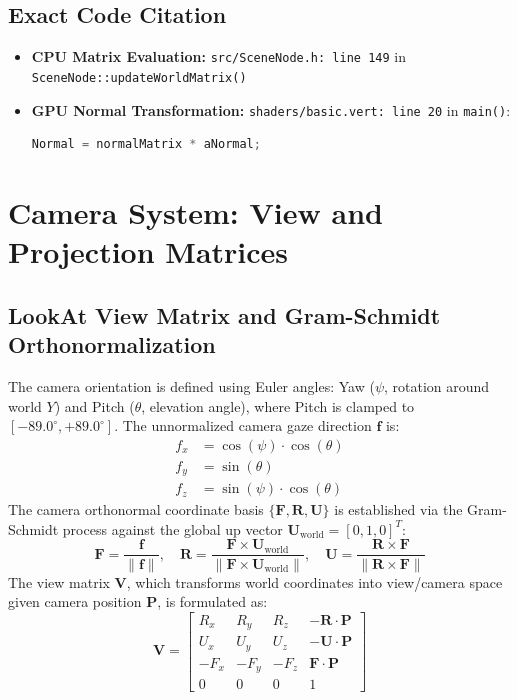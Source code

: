 \subsection{Exact Code Citation}
\begin{itemize}
    \item \textbf{CPU Matrix Evaluation:} \texttt{src/SceneNode.h: line 149} in \texttt{SceneNode::updateWorldMatrix()}
    \item \textbf{GPU Normal Transformation:} \texttt{shaders/basic.vert: line 20} in \texttt{main()}:
    \begin{lstlisting}[language=GLSL, basicstyle=\ttfamily\scriptsize]
    Normal = normalMatrix * aNormal;
    \end{lstlisting}
\end{itemize}

\section{Camera System: View and Projection Matrices}
\subsection{LookAt View Matrix and Gram-Schmidt Orthonormalization}
The camera orientation is defined using Euler angles: Yaw ($\psi$, rotation around world $Y$) and Pitch ($\theta$, elevation angle), where Pitch is clamped to $[-89.0^\circ, +89.0^\circ]$. The unnormalized camera gaze direction $\mathbf{f}$ is:
\begin{equation}
\begin{aligned}
f_x &= \cos(\psi) \cdot \cos(\theta) \\
f_y &= \sin(\theta) \\
f_z &= \sin(\psi) \cdot \cos(\theta)
\end{aligned}
\end{equation}
The camera orthonormal coordinate basis $\{\mathbf{F}, \mathbf{R}, \mathbf{U}\}$ is established via the Gram-Schmidt process against the global up vector $\mathbf{U}_{\text{world}} = [0, 1, 0]^T$:
\begin{equation}
\mathbf{F} = \frac{\mathbf{f}}{\|\mathbf{f}\|}, \quad
\mathbf{R} = \frac{\mathbf{F} \times \mathbf{U}_{\text{world}}}{\|\mathbf{F} \times \mathbf{U}_{\text{world}}\|}, \quad
\mathbf{U} = \frac{\mathbf{R} \times \mathbf{F}}{\|\mathbf{R} \times \mathbf{F}\|}
\end{equation}
The view matrix $\mathbf{V}$, which transforms world coordinates into view/camera space given camera position $\mathbf{P}$, is formulated as:
\begin{equation}
\mathbf{V} = \begin{bmatrix}
R_x & R_y & R_z & -\mathbf{R}\cdot\mathbf{P} \\
U_x & U_y & U_z & -\mathbf{U}\cdot\mathbf{P} \\
-F_x & -F_y & -F_z & \mathbf{F}\cdot\mathbf{P} \\
0 & 0 & 0 & 1
\end{bmatrix}
\label{eq:view_matrix}
\end{equation}

